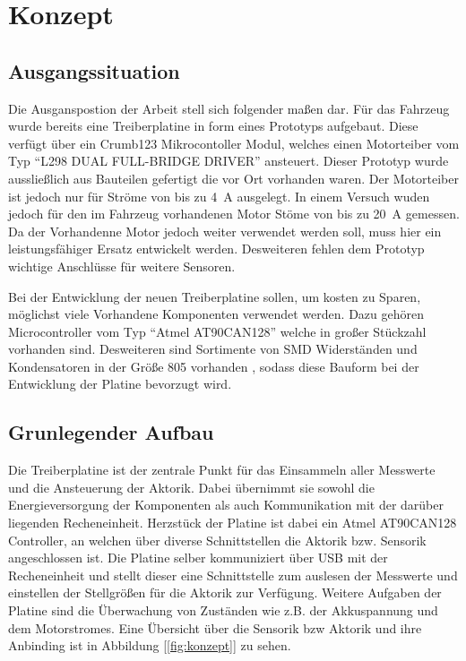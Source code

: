 
\chapter{Konzept}

\section{Ausgangssituation}
Die Ausganspostion der Arbeit stell sich folgender maßen dar. Für das Fahrzeug wurde bereits eine Treiberplatine in form eines Prototyps aufgebaut.
Diese verfügt über ein Crumb123 Mikrocontoller Modul, welches einen Motorteiber vom Typ ``L298 DUAL FULL-BRIDGE DRIVER'' ansteuert. Dieser Prototyp
wurde aussließlich aus Bauteilen gefertigt die vor Ort vorhanden waren. Der Motorteiber ist jedoch nur für Ströme von bis zu \SI{4}{\A} ausgelegt.
In einem Versuch wuden jedoch für den im Fahrzeug vorhandenen Motor Stöme von bis zu \SI{20}{\A} gemessen. Da der Vorhandenne Motor jedoch weiter
verwendet werden soll, muss hier ein leistungsfähiger Ersatz entwickelt werden. Desweiteren fehlen dem Prototyp wichtige Anschlüsse für weitere Sensoren.

Bei der Entwicklung der neuen Treiberplatine sollen, um kosten zu Sparen, möglichst viele Vorhandene Komponenten verwendet werden. Dazu gehören
Microcontroller vom Typ ``Atmel AT90CAN128'' welche in großer Stückzahl vorhanden sind. Desweiteren sind Sortimente von SMD Widerständen und
Kondensatoren in der Größe 805 vorhanden , sodass diese Bauform bei der Entwicklung der Platine bevorzugt wird.

\section{Grunlegender Aufbau}

Die Treiberplatine ist der zentrale Punkt für das Einsammeln aller Messwerte und die Ansteuerung der Aktorik. Dabei übernimmt sie sowohl die Energieversorgung der Komponenten als auch
Kommunikation mit der darüber liegenden Recheneinheit. Herzstück der Platine ist dabei ein Atmel AT90CAN128 \textmu Controller, an welchen über diverse Schnittstellen die Aktorik bzw. Sensorik
angeschlossen ist. Die Platine selber kommuniziert über USB mit der Recheneinheit und stellt dieser eine Schnittstelle zum auslesen der Messwerte und einstellen der Stellgrößen für die Aktorik
zur Verfügung. Weitere Aufgaben der Platine sind die Überwachung von Zuständen wie z.B. der Akkuspannung und dem Motorstromes. Eine Übersicht über die Sensorik bzw Aktorik und ihre Anbinding ist in 
Abbildung [\ref{fig:konzept}] zu sehen.

